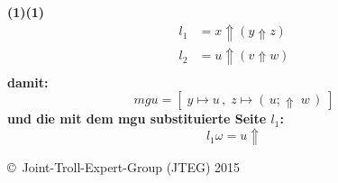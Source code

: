 \documentclass{article}
\begin{document}
		\textbf{(1)(1)}
			\begin{align*}
				l_1 &= x \Uparrow ( y \Uparrow z)  \\
				l_2 &= u \Uparrow ( v \Uparrow w)  \\
			\end{align*}
		\textbf{damit:}
			\[
				mgu = [\;y \mapsto u\,,\;z \mapsto (\,u;\Uparrow\;w\,)\;]
			\]
		\textbf{und die mit dem mgu substituierte Seite $l_1$:}
			\[
				l_1\omega = u \Uparrow 
			\]
		
		
		
		
		
		
		
		
		
		
		
	
		
		
		
	\begin{tiny}
	\copyright\ Joint-Troll-Expert-Group (JTEG) 2015
	\end{tiny}
\end{document}
